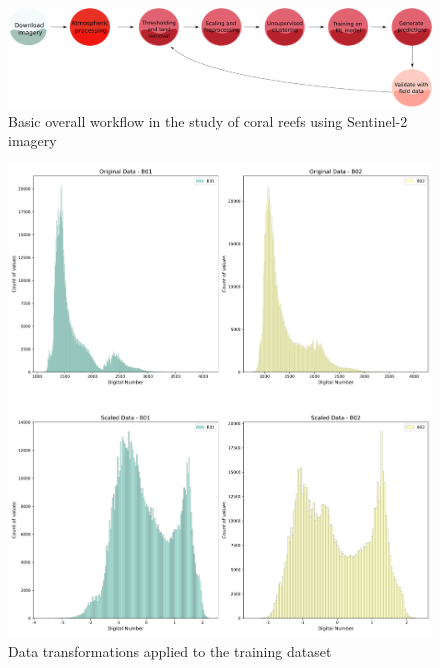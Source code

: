 \documentclass[journal,article,submit,pdftex,moreauthors]{Definitions/mdpi}
\begin{document}
\begin{figure}
	\includegraphics[width=\linewidth]{Images/Flow_Chart.png}
	\caption{Basic overall workflow in the study of coral reefs using Sentinel-2 imagery}
	\label{fig:workflow}
\end{figure}

\begin{figure}
	\includegraphics[width=\linewidth]{Images/Scaling_Training_Data.png}
	\caption{Data transformations applied to the training dataset}
	\label{fig:Scaling}
\end{figure}
\end{document}
